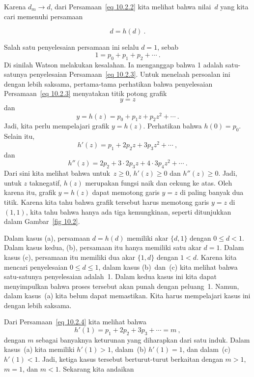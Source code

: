 \begin{example}
Karena $d_m \to d$, dari Persamaan~\ref{eq 10.2.2} kita melihat bahwa nilai~$d$ yang
kita cari memenuhi persamaan

\begin{equation}
d = h(d)\ . 
\label{eq 10.2.3}
\end{equation}
 
Salah satu penyelesaian persamaan ini selalu $d = 1$, sebab
$$
1 = p_0 + p_1 + p_2 +\cdots\ .
$$
Di sinilah Watson melakukan kesalahan.  Ia menganggap bahwa 1 adalah satu-satunya penyelesaian
Persamaan~\ref{eq 10.2.3}.  Untuk menelaah persoalan ini dengan lebih saksama, pertama-tama perhatikan
bahwa penyelesaian Persamaan~\ref{eq 10.2.3} menyatakan titik potong grafik
$$
y = z
$$
dan
$$
y = h(z) = p_0 + p_1z + p_2z^2 +\cdots\ .
$$
Jadi, kita perlu mempelajari grafik $y = h(z)$.
Perhatikan bahwa $h(0) = p_0$.  Selain itu,
\begin{equation}
h'(z) = p_1 + 2p_2z + 3p_3z^2 +\cdots\ ,  \label{eq 10.2.4}
\end{equation}
dan
$$
h''(z) = 2p_2 + 3 \cdot 2p_3z + 4 \cdot 3p_4z^2 + \cdots\ .
$$
Dari sini kita melihat bahwa untuk~$z \geq 0$, $h'(z) \geq 0$ dan $h''(z) \geq 0$.  Jadi,
untuk $z$ taknegatif, $h(z)$ merupakan fungsi naik dan cekung ke atas. 
Oleh karena itu, grafik $y = h(z)$ dapat memotong garis $y = z$ di paling banyak dua
titik.  Karena kita tahu bahwa grafik tersebut harus memotong garis $y = z$ di $(1,1)$, kita tahu
bahwa hanya ada tiga kemungkinan, seperti ditunjukkan dalam Gambar~\ref{fig 10.2}.
\par
Dalam kasus (a), persamaan $d = h(d)$ memiliki akar $\{d,1\}$ dengan $0 \leq d <
1$.  Dalam kasus kedua, (b), persamaan itu hanya memiliki satu akar $d = 1$.  Dalam kasus (c), persamaan itu
memiliki dua akar $\{1,d\}$ dengan $1 < d$.  Karena kita mencari penyelesaian $0
\leq d \leq 1$, dalam kasus (b)~dan~(c) kita melihat bahwa satu-satunya penyelesaian adalah~1.  Dalam
kedua kasus ini kita dapat menyimpulkan bahwa proses tersebut akan punah dengan peluang~1. 
Namun, dalam kasus~(a) kita belum dapat memastikan.  Kita harus mempelajari kasus ini dengan lebih saksama.
\par
Dari Persamaan~\ref{eq 10.2.4} kita melihat bahwa
$$
h'(1) = p_1 + 2p_2 + 3p_3 +\cdots= m\ ,
$$
dengan $m$ sebagai banyaknya keturunan yang diharapkan dari satu induk.  Dalam
kasus~(a) kita memiliki $h'(1) > 1$, dalam~(b) $h'(1) = 1$, dan dalam~(c) $h'(1) < 1$.  Jadi,
ketiga kasus tersebut berturut-turut berkaitan dengan $m > 1$, $m = 1$, dan $m < 1$.  Sekarang kita andaikan

\end{example}
